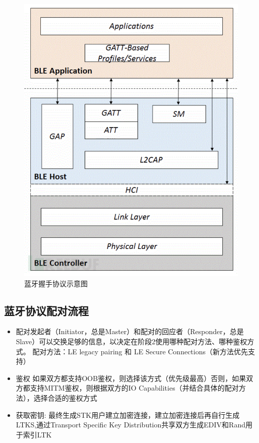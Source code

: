 \begin{figure}
    \centering
    \includegraphics[scale=0.5]{resources/img/i15.png}
    \caption{蓝牙握手协议示意图}
  \end{figure}

\subsection{蓝牙协议配对流程}
\begin{itemize}
    \item 配对发起者（Initiator，总是Master）和配对的回应者（Responder，总是Slave）可以交换足够的信息，以决定在阶段2使用哪种配对方法、哪种鉴权方式。
    配对方法：LE legacy pairing 和 LE Secure Connections（新方法优先支持）
    \item 鉴权 如果双方都支持OOB鉴权，则选择该方式（优先级最高）否则，如果双方都支持MITM鉴权，则根据双方的IO Capabilities（并结合具体的配对方法），选择合适的鉴权方式
    \item 获取密钥: 最终生成STK用户建立加密连接，建立加密连接后再自行生成LTKS,通过Transport Specific Key Distribution共享双方生成EDIV和Rand用于索引LTK
\end{itemize}

